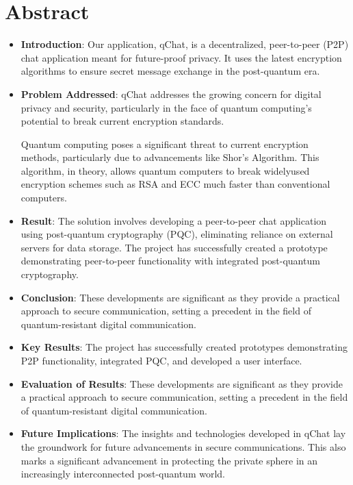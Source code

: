 \chapter*{Abstract}
\begin{itemize}
	\item \textbf{Introduction}:
	      Our application, qChat, is a decentralized, peer-to-peer (P2P) chat application meant for future-proof privacy. It uses the latest encryption algorithms to ensure secret message exchange in the post-quantum era.

	\item \textbf{Problem Addressed}: qChat addresses the growing concern for digital privacy and security, particularly in the face of quantum computing's potential to break current encryption standards.

	      Quantum computing poses a significant threat to current encryption methods, particularly due to advancements like Shor's Algorithm. This algorithm, in theory, allows quantum computers to break widelyused encryption schemes such as RSA and ECC much faster than conventional computers.

	\item \textbf{Result}:
	      The solution involves developing a peer-to-peer chat application using post-quantum cryptography (PQC), eliminating reliance on external servers for data storage. The project has successfully created a prototype demonstrating peer-to-peer functionality with integrated post-quantum cryptography.

	\item \textbf{Conclusion}:
	      These developments are significant as they provide a practical approach to secure communication, setting a precedent in the field of quantum-resistant digital communication.

	\item \textbf{Key Results}: The project has successfully created prototypes demonstrating P2P functionality, integrated PQC, and developed a user interface.

	\item \textbf{Evaluation of Results}: These developments are significant as they provide a practical approach to secure communication, setting a precedent in the field of quantum-resistant digital communication.

	\item \textbf{Future Implications}: The insights and technologies developed in qChat lay the groundwork for future advancements in secure communications. This also marks a significant advancement in protecting the private sphere in an increasingly interconnected post-quantum world.

\end{itemize}


